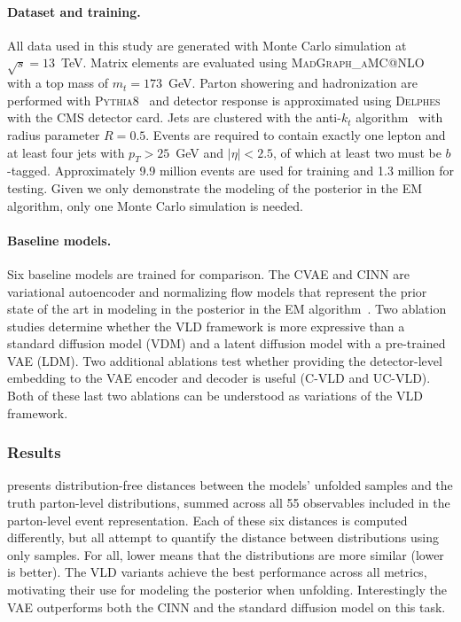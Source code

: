 \paragraph{Dataset and training.}
All data used in this study are generated with Monte Carlo simulation at $\sqrt{s} = 13$~TeV.
Matrix elements are evaluated using \textsc{MadGraph\_aMC@NLO}~\cite{Alwall:2014hca} with a top mass of $m_t = 173$~GeV.
Parton showering and hadronization are performed with \textsc{Pythia8}~\cite{Sjostrand:2014zea} and detector response is approximated using \textsc{Delphes}~\cite{deFavereau:2013fsa} with the CMS detector card.
Jets are clustered with the anti-$k_t$ algorithm~\cite{Cacciari:2008gp} with radius parameter $R = 0.5$.
Events are required to contain exactly one lepton and at least four jets with $p_T > 25$~GeV and $|\eta| < 2.5$, of which at least two must be $b$-tagged.
Approximately 9.9 million events are used for training and 1.3 million for testing.
Given we only demonstrate the modeling of the posterior in the EM algorithm, only one Monte Carlo simulation is needed.

\paragraph{Baseline models.}
Six baseline models are trained for comparison.
The CVAE and CINN are variational autoencoder and normalizing flow models that represent the prior state of the art in modeling in the posterior in the EM algorithm~\cite{Bellagente:2020piv}.
Two ablation studies determine whether the VLD framework is more expressive than a standard diffusion model (VDM) and a latent diffusion model with a pre-trained VAE (LDM).
Two additional ablations test whether providing the detector-level embedding to the VAE encoder and decoder is useful (C-VLD and UC-VLD).
Both of these last two ablations can be understood as variations of the VLD framework.

\subsubsection{Results}

 presents distribution-free distances between the models' unfolded samples and the truth parton-level distributions, summed across all 55 observables included in the parton-level event representation.
Each of these six distances is computed differently, but all attempt to quantify the distance between distributions using only samples.
For all, lower means that the distributions are more similar (lower is better).
The VLD variants achieve the best performance across all metrics, motivating their use for modeling the posterior when unfolding.
Interestingly the VAE outperforms both the CINN and the standard diffusion model on this task.

